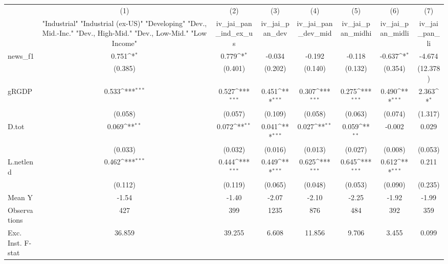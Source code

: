 {
\def\sym#1{\ifmmode^{#1}\else\(^{#1}\)\fi}
\begin{tabular}{l*{7}{c}}
\toprule
            &\multicolumn{1}{c}{(1)}&\multicolumn{1}{c}{(2)}&\multicolumn{1}{c}{(3)}&\multicolumn{1}{c}{(4)}&\multicolumn{1}{c}{(5)}&\multicolumn{1}{c}{(6)}&\multicolumn{1}{c}{(7)}\\
            &\multicolumn{1}{c}{ "Industrial" "Industrial (ex-US)" "Developing" "Dev., Mid.-Inc." "Dev., High-Mid."  "Dev., Low-Mid." "Low Income" }&\multicolumn{1}{c}{iv\_jai\_pan\_ind\_ex\_us}&\multicolumn{1}{c}{iv\_jai\_pan\_dev}&\multicolumn{1}{c}{iv\_jai\_pan\_dev\_mid}&\multicolumn{1}{c}{iv\_jai\_pan\_midhi}&\multicolumn{1}{c}{iv\_jai\_pan\_midli}&\multicolumn{1}{c}{iv\_jai\_pan\_li}\\
\midrule
news\_f1     &       0.751\sym{*}  &       0.779\sym{*}  &      -0.034         &      -0.192         &      -0.118         &      -0.637\sym{*}  &      -4.674         \\
            &     (0.385)         &     (0.401)         &     (0.202)         &     (0.140)         &     (0.132)         &     (0.354)         &    (12.378)         \\
\addlinespace
gRGDP       &       0.533\sym{***}&       0.527\sym{***}&       0.451\sym{***}&       0.307\sym{***}&       0.275\sym{***}&       0.490\sym{***}&       2.363\sym{*}  \\
            &     (0.058)         &     (0.057)         &     (0.109)         &     (0.058)         &     (0.063)         &     (0.074)         &     (1.317)         \\
\addlinespace
D.tot       &       0.069\sym{**} &       0.072\sym{**} &       0.041\sym{***}&       0.027\sym{**} &       0.059\sym{**} &      -0.002         &       0.029         \\
            &     (0.033)         &     (0.032)         &     (0.016)         &     (0.013)         &     (0.027)         &     (0.008)         &     (0.053)         \\
\addlinespace
L.netlend   &       0.462\sym{***}&       0.444\sym{***}&       0.449\sym{***}&       0.625\sym{***}&       0.645\sym{***}&       0.612\sym{***}&       0.211         \\
            &     (0.112)         &     (0.119)         &     (0.065)         &     (0.048)         &     (0.053)         &     (0.090)         &     (0.235)         \\
\midrule
Mean Y      &       -1.54         &       -1.40         &       -2.07         &       -2.10         &       -2.25         &       -1.92         &       -1.99         \\
Observations&         427         &         399         &        1235         &         876         &         484         &         392         &         359         \\
Exc. Inst. F-stat&      36.859         &      39.255         &       6.608         &      11.856         &       9.706         &       3.455         &       0.099         \\
\bottomrule
\end{tabular}
}
